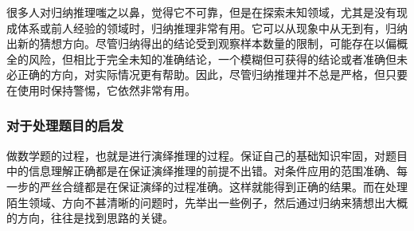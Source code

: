 很多人对归纳推理嗤之以鼻，觉得它不可靠，但是在探索未知领域，尤其是没有现成体系或前人经验的领域时，归纳推理非常有用。它可以从现象中从无到有，归纳出新的猜想方向。尽管归纳得出的结论受到观察样本数量的限制，可能存在以偏概全的风险，但相比于完全未知的准确结论，一个模糊但可获得的结论或者准确但未必正确的方向，对实际情况更有帮助。因此，尽管归纳推理并不总是严格，但只要在使用时保持警惕，它依然非常有用。

\subsubsection{对于处理题目的启发}

做数学题的过程，也就是进行演绎推理的过程。保证自己的基础知识牢固，对题目中的信息理解正确都是在保证演绎推理的前提不出错。对条件应用的范围准确、每一步的严丝合缝都是在保证演绎的过程准确。这样就能得到正确的结果。而在处理陌生领域、方向不甚清晰的问题时，先举出一些例子，然后通过归纳来猜想出大概的方向，往往是找到思路的关键。